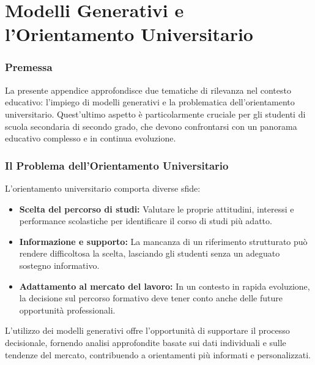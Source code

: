 \chapter{Modelli Generativi e l'Orientamento Universitario}
\subsection*{Premessa}
La presente appendice approfondisce due tematiche di rilevanza nel contesto educativo: l'impiego di modelli generativi e la problematica dell'orientamento universitario. Quest'ultimo aspetto è particolarmente cruciale per gli studenti di scuola secondaria di secondo grado, che devono confrontarsi con un panorama educativo complesso e in continua evoluzione.

\subsection*{Il Problema dell'Orientamento Universitario}
L'orientamento universitario comporta diverse sfide:
\begin{itemize}
    \item \textbf{Scelta del percorso di studi:} Valutare le proprie attitudini, interessi e performance scolastiche per identificare il corso di studi più adatto.
    \item \textbf{Informazione e supporto:} La mancanza di un riferimento strutturato può rendere difficoltosa la scelta, lasciando gli studenti senza un adeguato sostegno informativo.
    \item \textbf{Adattamento al mercato del lavoro:} In un contesto in rapida evoluzione, la decisione sul percorso formativo deve tener conto anche delle future opportunità professionali.
\end{itemize}
L’utilizzo dei modelli generativi offre l’opportunità di supportare il processo decisionale, fornendo analisi approfondite basate sui dati individuali e sulle tendenze del mercato, contribuendo a orientamenti più informati e personalizzati.

